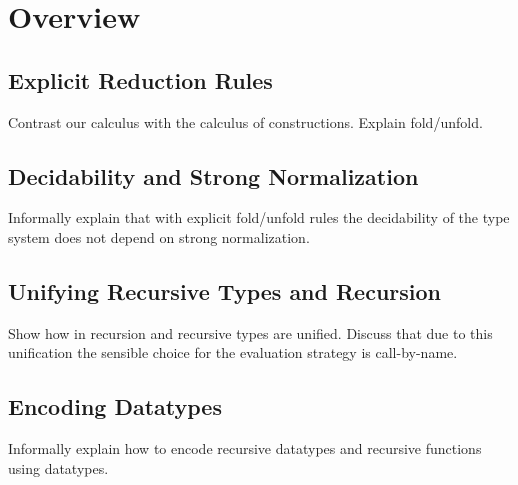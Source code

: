 \section{Overview}


\subsection{Explicit Reduction Rules}

Contrast our calculus with the calculus of constructions. Explain fold/unfold. 

\subsection{Decidability and Strong Normalization}

Informally explain that with explicit fold/unfold rules the decidability of the 
type system does not depend on strong normalization.

\subsection{Unifying Recursive Types and Recursion}

Show how in \name recursion and recursive types are unified. 
Discuss that due to this unification the sensible choice for the 
evaluation strategy is call-by-name. 

\subsection{Encoding Datatypes}

Informally explain how to encode recursive datatypes and recursive functions 
using datatypes.